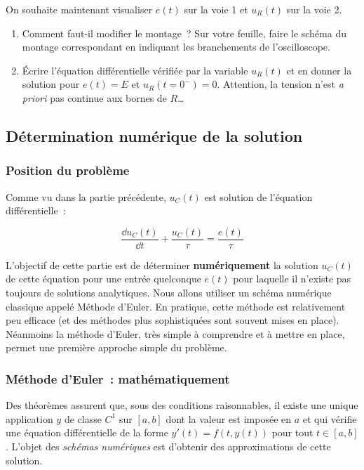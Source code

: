 \documentclass[a4paper, 11pt, final, garamond]{book}
\begin{document}
On souhaite maintenant visualiser $e(t)$ sur la voie 1 et $u_{R}(t)$ sur la voie
2.

\begin{enumerate}[resume]
    \item Comment faut-il modifier le montage~? Sur votre feuille, faire le
        schéma du montage correspondant en indiquant les branchements de
        l'oscilloscope. 
    \item Écrire l'équation différentielle vérifiée par la variable $u_{R}(t)$
        et en donner la solution pour $e(t) = E$ et $u_{R}(t=0^-) = 0$.
        Attention, la tension n'est \textit{a priori} pas continue aux bornes de
        $R$…
\end{enumerate}

\subsection{Détermination numérique de la solution}

\subsubsection{Position du problème}

Comme vu dans la partie précédente, $u_{C}(t)$ est solution de l'équation
différentielle~:

\[\frac{\dd u_{C}(t)}{\dd t} + \frac{u_{C}(t)}{\tau} = \frac{e(t)}{\tau}\]

L'objectif de cette partie est de déterminer \textbf{numériquement} la solution
$u_{C}(t)$ de cette équation pour une entrée quelconque $e(t)$ pour laquelle il
n'existe pas toujours de solutions analytiques. Nous allons utiliser un schéma
numérique classique appelé Méthode d'Euler. En pratique, cette méthode est
relativement peu efficace (et des méthodes plus sophistiquées sont souvent mises
en place). Néanmoins la méthode d'Euler, très simple à comprendre et à mettre en
place, permet une première approche simple du problème.

\subsubsection{Méthode d'Euler~: mathématiquement}

Des théorèmes assurent que, sous des conditions raisonnables, il existe une
unique application $y$ de classe $C^1$ sur $[a,b]$ dont la valeur est imposée en
$a$ et qui vérifie une équation différentielle de la forme $y'(t)=f(t,y(t))$
pour tout $t \in [a,b]$. L'objet des \textit{schémas numériques} est d'obtenir
des approximations de cette solution.\bigbreak
\end{document}
